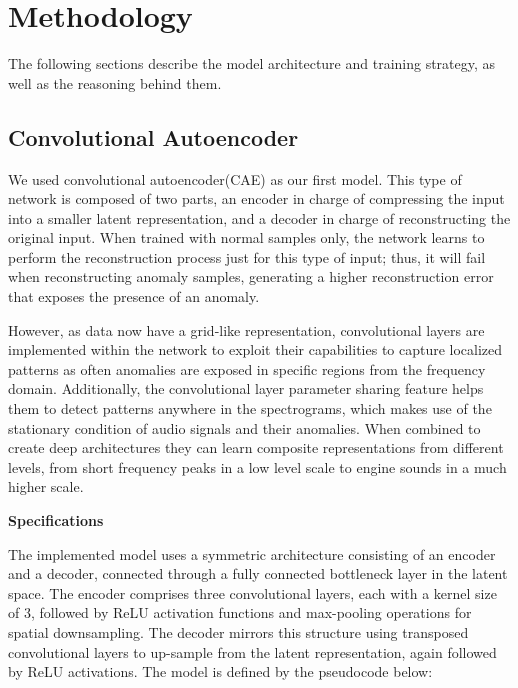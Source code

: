 \section{Methodology}
\label{sec:Modelling Approach}

The following sections describe the model architecture and training strategy, as well as the reasoning behind them. 

\subsection{Convolutional Autoencoder}
\label{subsec:Model Architecture}
We used convolutional autoencoder(CAE) as our first model. This type of network is composed of two parts, an encoder in charge of compressing the input into a smaller latent representation, and a decoder in charge of reconstructing the original input. When trained with normal samples only, the network learns to perform the reconstruction process just for this type of input; thus, it will fail when reconstructing anomaly samples, generating a higher reconstruction error that exposes the presence of an anomaly.

However, as data now have a grid-like representation, convolutional layers are implemented within the network to exploit their capabilities to capture localized patterns as often anomalies are exposed in specific regions from the frequency domain. Additionally, the convolutional layer parameter sharing feature helps them to detect patterns anywhere in the spectrograms, which makes use of the stationary condition of audio signals and their anomalies. When combined to create deep architectures they can learn composite representations from different levels, from short frequency peaks in a low level scale to engine sounds in a much higher scale.

\textbf{Specifications}

The implemented model uses a symmetric architecture consisting of an encoder and a decoder, connected through a fully connected bottleneck layer in the latent space. The encoder comprises three convolutional layers, each with a kernel size of 3, followed by ReLU activation functions and max-pooling operations for spatial downsampling. The decoder mirrors this structure using transposed convolutional layers to up-sample from the latent representation, again followed by ReLU activations. The model is defined by the pseudocode below:


